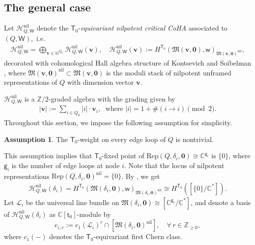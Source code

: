 \documentclass[10pt]{amsart}
\theoremstyle{definition}
\newtheorem{Assumption}[Theorem]{Assumption}
\numberwithin{equation}{section}
\newcommand{\bC}{\mathbb{C}}
\newcommand{\bN}{\mathbb{N}}
\newcommand{\bZ}{\mathbb{Z}}
\newcommand{\bv}{\mathbf{v}}
\newcommand{\bd}{\mathbf{d}}
\newcommand{\fM}{\mathfrak{M}}
\newcommand{\sT}{\mathsf{T}}
\newcommand{\sW}{\mathsf{W}}
\newcommand{\sw}{\mathsf{w}}
\newcommand{\tr}{\operatorname{tr}}
\newcommand{\In}{\operatorname{in}}
\newcommand{\Out}{\operatorname{out}}
\begin{document}
\subsection{The general case}


Let $\mathcal{H}^{\mathrm{nil}}_{Q,\sW}$ denote the $\sT_0$-\textit{equivariant} 
\textit{nilpotent critical CoHA} associated to $(Q,\sW)$,~i.e.
\begin{align}\label{equ on HQsw}
    \mathcal{H}^{\mathrm{nil}}_{Q,\sW}=\bigoplus_{\bv\in \bN^{Q_0}}\mathcal{H}^{\mathrm{nil}}_{Q,\sW}(\bv),\quad \mathcal{H}^{\mathrm{nil}}_{Q,\sW}(\bv):=H^{\sT_0}(\fM(\bv,\mathbf 0),\sw)_{\fM(\bv,\mathbf 0)^{\mathrm{nil}}},
\end{align}
decorated with cohomological Hall algebra structure of Kontsevich and Soibelman \cite{CoHA}, where $\fM(\bv,\mathbf 0)^{\mathrm{nil}}\subset \fM(\bv,\mathbf 0)$ is the moduli stack of nilpotent unframed representations of $Q$ with dimension vector $\bv$. 

$\mathcal{H}^{\mathrm{nil}}_{Q,\sW}$ is a $\bZ/2$-graded algebra with the grading given by
\begin{align}\label{equ on gra}
    |\bv|:=\sum_{i\in Q_0}|i|\cdot\bv_i,\;\,\, \text{where } |i|=1+\# (i\to i)\pmod{2}.
\end{align}
Throughout this section, we impose the following assumption for simplicity.
\begin{Assumption}
The $\sT_0$-weight on every edge loop of $Q$ is nontrivial.
\end{Assumption}
This assumption implies that $\sT_0$-fixed point of $\mathrm{Rep}(Q,\delta_i,\mathbf 0)\cong \bC^{\mathsf g_i}$ is $\{0\}$, where $\mathsf g_i$ is the number of edge loops at node $i$. Note that the locus of nilpotent representations $\mathrm{Rep}(Q,\delta_i,\mathbf 0)^{\mathrm{nil}}=\{0\}$. By \cite[Prop.~2.4]{COZZ}, we get
\begin{align*}
    \mathcal{H}^{\mathrm{nil}}_{Q,\sW}(\delta_i)=H^{\sT_0}(\fM(\delta_i,\mathbf 0),\sw)_{\fM(\delta_i,\mathbf 0)^{\mathrm{nil}}}\cong H^{\sT_0}([\{0\}/\bC^*]).
\end{align*}
Let $\mathcal L_i$ be the universal line bundle on $\fM(\delta_i,\mathbf 0)\cong [\bC^{\mathsf g_i}/\bC^*]$, and denote a basis of $\mathcal{H}^{\mathrm{nil}}_{Q,\sW}(\delta_i)$ as $\bC[\mathsf t_0]$-module by  $$e_{i,r}:=c_1(\mathcal L_{i})^{r}\cap\left[\fM(\delta_i,\mathbf 0)^{\mathrm{nil}}\right], \quad \forall \, r\in \bZ_{\geqslant 0}, $$  
where $c_1(-)$ denotes the $\sT_0$-equivariant first Chern class. 
\end{document}
